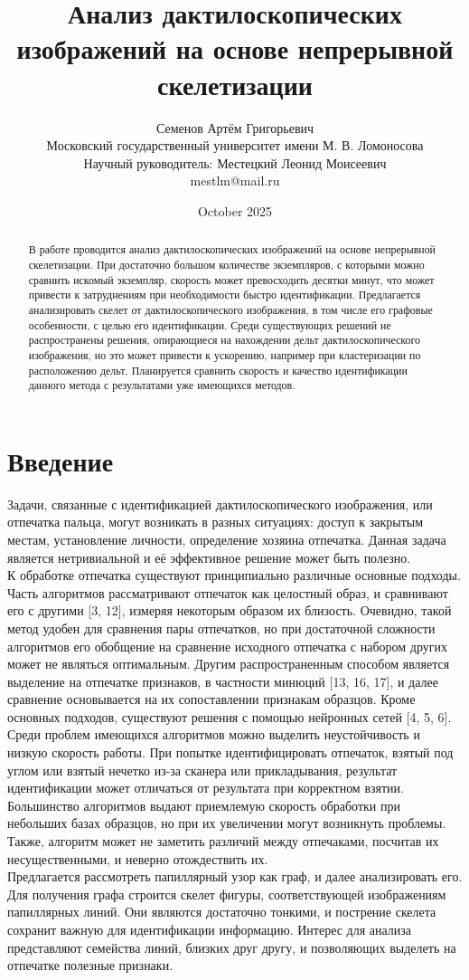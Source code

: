 \documentclass{article}
\title{Анализ дактилоскопических изображений на основе непрерывной скелетизации}
\author{ Семенов Артём Григорьевич\\
	Московский государственный университет имени М. В. Ломоносова \\
        Научный руководитель: Местецкий Леонид Моисеевич \\ 
        mestlm@mail.ru}
\date{October 2025}
\begin{document}
\maketitle
\begin{abstract}
    В работе проводится анализ дактилоскопических изображений на основе непрерывной скелетизации. При достаточно большом количестве экземпляров, с которыми можно сравнить искомый экземпляр, скорость может превосходить десятки минут, что может привести к затруднениям при необходимости быстро идентификации. Предлагается анализировать скелет от дактилоскопического изображения, в том числе его графовые особенности, с целью его идентификации. Среди существующих решений не распространены решения, опирающиеся на нахождении дельт дактилоскопического изображения, но это может привести к ускорению, например при кластеризации по расположению дельт. Планируется сравнить скорость и качество идентификации данного метода с результатами уже имеющихся методов.
\end{abstract}
\section{Введение}
Задачи, связанные с идентификацией дактилоскопического изображения, или отпечатка пальца, могут возникать в разных ситуациях: доступ к закрытым местам, установление личности, определение хозяина отпечатка. Данная задача является нетривиальной и её эффективное решение может быть полезно. \\
К обработке отпечатка существуют принципиально различные основные подходы. Часть алгоритмов рассматривают отпечаток как целостный образ, и сравнивают его с другими [3, 12], измеряя некоторым образом их близость. Очевидно, такой метод удобен для сравнения пары отпечатков, но при достаточной сложности алгоритмов его обобщение на сравнение исходного отпечатка с набором других может не являться оптимальным. Другим распространенным способом является выделение на отпечатке признаков, в частности минюций [13, 16, 17], и далее сравнение основывается на их сопоставлении признакам образцов. Кроме основных подходов, существуют решения с помощью нейронных сетей [4, 5, 6]. \\
Среди проблем имеющихся алгоритмов можно выделить неустойчивость и низкую скорость работы. При попытке идентифицировать отпечаток, взятый под углом или взятый нечетко из-за сканера или прикладывания, результат идентификации может отличаться от результата при корректном взятии. Большинство алгоритмов выдают приемлемую скорость обработки при небольших базах образцов, но при их увеличении могут возникнуть проблемы. Также, алгоритм может не заметить различий между отпечаками, посчитав их несущественными, и неверно отождествить их. \\
Предлагается рассмотреть папиллярный узор как граф, и далее анализировать его. Для получения графа строится скелет фигуры, соответствующей изображениям папиллярных линий. Они являются достаточно тонкими, и пострение скелета сохранит важную для идентификации информацию. Интерес для анализа представляют семейства линий, близких друг другу, и позволяющих выделеть на отпечатке полезные признаки.
\end{document}
